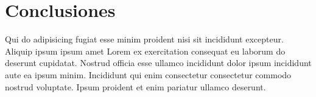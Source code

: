 \section{Conclusiones}
Qui do adipisicing fugiat esse minim proident nisi sit incididunt excepteur. Aliquip ipsum ipsum amet Lorem ex exercitation consequat eu laborum do deserunt cupidatat. Nostrud officia esse ullamco incididunt dolor ipsum incididunt aute ea ipsum minim. Incididunt qui enim consectetur consectetur commodo nostrud voluptate. Ipsum proident et enim pariatur ullamco deserunt.

